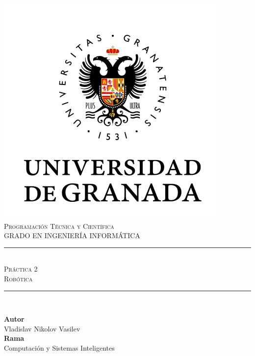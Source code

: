 \documentclass[11pt,a4paper]{article}
\newcommand{\asignatura}{Programación Técnica y Científica}
\newcommand{\autor}{Vladislav Nikolov Vasilev}
\newcommand{\titulo}{Práctica 2}
\newcommand{\subtitulo}{Robótica}
\begin{document}

\begin{titlepage}

\begin{minipage}{\textwidth}

\centering

\includegraphics[scale=0.5]{img/ugr.png}\\

\textsc{\Large \asignatura{}\\[0.2cm]}
\textsc{GRADO EN INGENIERÍA INFORMÁTICA}\\[1cm]

\noindent\rule[-1ex]{\textwidth}{1pt}\\[1.5ex]
\textsc{{\Huge \titulo\\[0.5ex]}}
\textsc{{\Large \subtitulo\\}}
\noindent\rule[-1ex]{\textwidth}{2pt}\\[3.5ex]

\end{minipage}

\vspace{0.5cm}

\begin{minipage}{\textwidth}

\centering

\textbf{Autor}\\ {\autor{}}\\[2.5ex]
\textbf{Rama}\\ {Computación y Sistemas Inteligentes}\\[2.5ex]
\vspace{0.3cm}


\end{minipage}
\end{titlepage}
\end{document}
